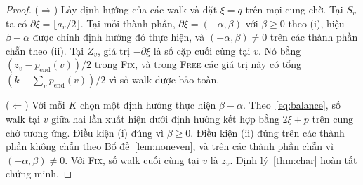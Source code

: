 \documentclass[pdflatex,sn-mathphys-num]{sn-jnl}
\theoremstyle{thmstyleone}%
\theoremstyle{thmstyletwo}%
\theoremstyle{thmstylethree}%
\newcommand{\FIX}{\textup{\textsc{Fix}}}
\newcommand{\FREE}{\textup{\textsc{Free}}}
\newcommand{\floor}[1]{\lfloor #1\rfloor}
\begin{document}
\begin{proof}
($\Rightarrow$) Lấy định hướng của các walk và đặt $\xi=q$ trên mọi cung chờ. Tại $S_v$ ta có $\partial\xi=\floor{a_v/2}$. Tại mỗi thành phần, $\partial\xi=(-\alpha,\beta)$ với $\beta\ge0$ theo (i), hiệu $\beta-\alpha$ được chính định hướng đó thực hiện, và $(-\alpha,\beta)\ne0$ trên các thành phần chẵn theo (ii). Tại $Z_v$, giá trị $-\partial\xi$ là số cặp cuối cùng tại $v$. Nó bằng $(z_v-p_{\mathrm{end}}(v))/2$ trong \FIX{}, và trong \FREE{} các giá trị này có tổng $(k-\sum_vp_{\mathrm{end}}(v))/2$ vì số walk được bảo toàn.

($\Leftarrow$) Với mỗi $K$ chọn một định hướng thực hiện $\beta-\alpha$. Theo~\eqref{eq:balance}, số walk tại $v$ giữa hai lần xuất hiện dưới định hướng kết hợp bằng $2\xi+p$ trên cung chờ tương ứng. Điều kiện (i) đúng vì $\beta\ge0$. Điều kiện (ii) đúng trên các thành phần không chẵn theo Bổ đề~\ref{lem:noneven}, và trên các thành phần chẵn vì $(-\alpha,\beta)\ne0$. Với \FIX{}, số walk cuối cùng tại $v$ là $z_v$. Định lý~\ref{thm:char} hoàn tất chứng minh.
\end{proof}
\end{document}
